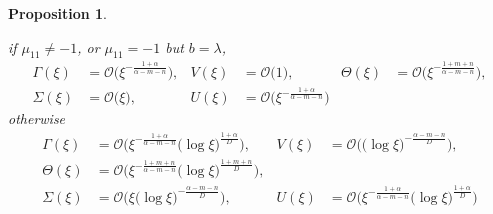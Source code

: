 \documentclass[a4paper,11pt]{article}
\def\BO{{\mathcal{O}}}
\newtheorem{proposition}{Proposition}[section]
\theoremstyle{remark}
\begin{document}
\begin{proposition}
\begin{enumerate}
  if $\mu_{11}\ne-1$, or $\mu_{11}=-1$ but $b=\lambda$,
  \begin{equation} \label{eq:ss_asymp1}
  \begin{aligned}
    \Gamma(\xi) &= \BO\big(\xi^{-\frac{1+\alpha}{\alpha-m-n}}), & V(\xi) &= \BO\big(1), &    \Theta(\xi) &= \BO\big(\xi^{-\frac{1+m+n}{\alpha-m-n}}),\\
   \Sigma(\xi) &= \BO\big(\xi), &   U(\xi) &= \BO\big(\xi^{-\frac{1+\alpha}{\alpha-m-n}})
  \end{aligned}
  \end{equation}
  otherwise
    \begin{equation} \label{eq:ss_asymp2}
  \begin{aligned}
    \Gamma(\xi) &= \BO\big(\xi^{-\frac{1+\alpha}{\alpha-m-n}}\big(\log\xi\big)^{\frac{1+\alpha}{D}}\big), & V(\xi) &= \BO\big(\big(\log\xi\big)^{-\frac{\alpha-m-n}{D}}\big),
    \\ 
        \Theta(\xi) &= \BO\big(\xi^{-\frac{1+m+n}{\alpha-m-n}}\big(\log\xi\big)^{\frac{1+m+n}{D}}\big),\\
   \Sigma(\xi) &= \BO\big(\xi\big(\log\xi\big)^{-\frac{\alpha-m-n}{D}}\big), &   U(\xi) &= \BO\big(\xi^{-\frac{1+\alpha}{\alpha-m-n}}\big(\log\xi\big)^{\frac{1+\alpha}{D}}\big)
  \end{aligned}
  \end{equation}
 \end{enumerate}

\end{proposition}
\end{document}
